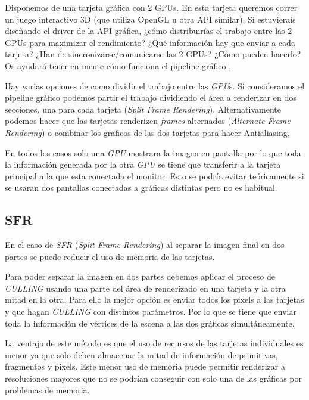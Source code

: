\begin{pregunta}{Disponemos de una tarjeta gráfica con 2 GPUs. En esta tarjeta queremos
    correr un juego interactivo 3D (que utiliza OpenGL u otra API similar). Si
    estuvierais diseñando el driver de la API gráfica, ¿cómo distribuirías el
    trabajo entre las 2 GPUs para maximizar el rendimiento?  ¿Qué información
    hay que enviar a cada tarjeta? ¿Han de sincronizarse/comunicarse las 2 GPUs?
    ¿Cómo pueden hacerlo? Os ayudará tener en mente cómo funciona el pipeline
gráfico} \sep{}

Hay varias opciones de como dividir el trabajo entre las \emph{GPU}s. Si
consideramos el pipeline gráfico podemos partir el trabajo dividiendo el área a
renderizar en dos secciones, una para cada tarjeta (\emph{Split Frame
Rendering}). Alternativamente podemos hacer que las tarjetas renderizen
\emph{frames} alternados (\emph{Alternate Frame Rendering}) o combinar los
graficos de las dos tarjetas para hacer Antialiasing.

En todos los casos solo una \emph{GPU} mostrara la imagen en pantalla por lo que
toda la información generada por la otra \emph{GPU} se tiene que transferir a la
tarjeta principal a la que esta conectada el monitor. Esto se podría evitar
teóricamente si se usaran dos pantallas conectadas a gráficas distintas pero no
es habitual. \cite{noauthor_sli_2011}

\subsection*{SFR}

En el caso de \emph{SFR} (\emph{Split Frame Rendering}) al separar la imagen
final en dos partes se puede reducir el uso de memoria de las tarjetas.

Para poder separar la imagen en dos partes debemos aplicar el proceso de
\emph{CULLING} usando una parte del área de renderizado en una tarjeta y la otra
mitad en la otra. Para ello la  mejor opción es enviar todos los pixels a las
tarjetas y que hagan \emph{CULLING} con distintos parámetros. Por lo que se
tiene que enviar toda la información de vértices de la escena a las dos gráficas
simultáneamente.

La ventaja de este método es que el uso de recursos de las tarjetas individuales
es menor ya que solo deben almacenar la mitad de información de primitivas, fragmentos y
pixels. Este menor uso de memoria puede permitir renderizar a resoluciones
mayores que no se podrían conseguir con solo una de las gráficas por problemas
de memoria.


\end{pregunta}
